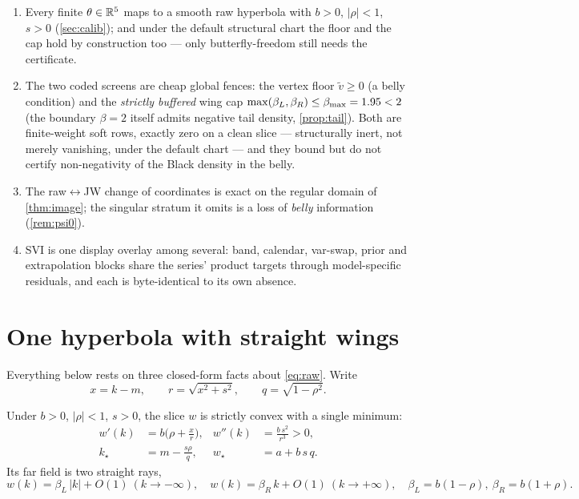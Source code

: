 \documentclass[11pt]{article}
\newcommand{\wmin}{w_\star}         %
\newcommand{\kmin}{k_\star}         %
\newcommand{\vmin}{\widetilde v}    %
\newcommand{\betL}{\beta_L}
\newcommand{\betR}{\beta_R}
\begin{document}
\begin{invariant}
\begin{enumerate}[leftmargin=1.6em]
\item Every finite $\theta\in\mathbb{R}^5$ maps to a smooth raw hyperbola with $b>0$,
$|\rho|<1$, $s>0$ (\cref{sec:calib}); and under the default structural chart
the floor and the cap hold by construction too --- only butterfly-freedom
still needs the certificate.
\item The two coded screens are cheap global fences: the vertex floor
$\vmin\ge0$ (a belly condition) and the \emph{strictly buffered} wing cap
$\max(\betL,\betR)\le\beta_{\max}=\svimomleecap<2$ (the boundary $\beta=2$
itself admits negative tail density, \cref{prop:tail}).  Both are
finite-weight soft rows, exactly zero on a clean slice --- structurally
inert, not merely vanishing, under the default chart --- and they bound but
do not certify non-negativity of the Black density in the belly.
\item The raw$\leftrightarrow$JW change of coordinates is exact on the regular
domain of \cref{thm:image}; the singular stratum it omits is a loss of
\emph{belly} information (\cref{rem:psi0}).
\item SVI is one display overlay among several: band, calendar, var-swap, prior
and extrapolation blocks share the series' product targets through
model-specific residuals, and each is byte-identical to its own absence.
\end{enumerate}
\end{invariant}

\section{One hyperbola with straight wings}
\label{sec:geometry}

Everything below rests on three closed-form facts about \eqref{eq:raw}.  Write
\begin{equation}
x=k-m,\qquad r=\sqrt{x^2+s^2},\qquad q=\sqrt{1-\rho^2}.
\label{eq:short}
\end{equation}

\begin{proposition}
\label{prop:geom}
Under $b>0$, $|\rho|<1$, $s>0$, the slice $w$ is strictly convex with a single
minimum:
\begin{align}
w'(k)&=b\Big(\rho+\frac{x}{r}\Big), &
w''(k)&=\frac{b\,s^2}{r^3}>0,
\label{eq:deriv}\\
\kmin&=m-\frac{s\rho}{q}, & \wmin&=a+b\,s\,q .
\label{eq:vertex}
\end{align}
Its far field is two straight rays,
\begin{equation}
w(k)=\betL\,|k|+O(1)\ (k\to-\infty),\quad
w(k)=\betR\,k+O(1)\ (k\to+\infty),\quad
\betL=b(1-\rho),\ \betR=b(1+\rho).
\label{eq:betas}
\end{equation}
\end{proposition}
\end{document}
